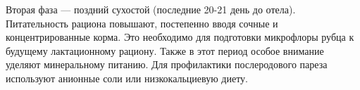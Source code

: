 Вторая фаза --- поздний сухостой (последние 20-21 день до отела). Питательность рациона повышают, постепенно вводя сочные и концентрированные корма. Это необходимо для подготовки микрофлоры рубца к будущему лактационному рациону. Также в этот период особое внимание уделяют минеральному питанию. Для профилактики послеродового пареза используют анионные соли или низкокальциевую диету.

